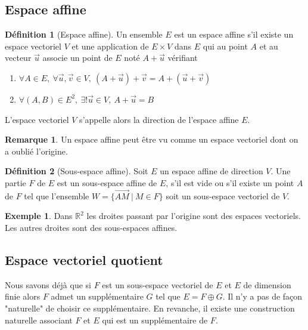 \documentclass[a4paper,12pt,titlepage]{article}
\theoremstyle{plain}
\theoremstyle{definition}
\newtheorem{defi}{Définition}
\newtheorem{rmq}{Remarque}
\newtheorem{ex}{Exemple}
\begin{document}
\subsection{Espace affine}
\begin{defi}[Espace affine]
  Un ensemble $E$ est un espace affine s'il existe un espace vectoriel $V$ et une application de $E \times V$ dans $E$ qui au point $A$ et au vecteur $\overrightarrow{u}$ associe un point de $E$ noté $A+\overrightarrow{u}$ vérifiant

  \begin{enumerate}
  \item $ \forall A \in E,~\forall \overrightarrow{u},\overrightarrow{v} \in V,~(A+\overrightarrow{u})+\overrightarrow{v}=A+(\overrightarrow{u}+\overrightarrow{v})$
  \item $ \forall (A,B) \in E^2,~\exists!\overrightarrow{u} \in V,~ A+\overrightarrow{u}=B$
  \end{enumerate}
  L'espace vectoriel $V$ s'appelle alors la direction de l'espace affine $E$.
\end{defi}

\begin{rmq}
  Un espace affine peut être vu comme un espace vectoriel dont on a oublié l'origine.
\end{rmq}

\begin{defi}[Sous-espace affine]
Soit $E$ un espace affine de direction $V$.
Une partie $F$ de $E$ est un sous-espace affine de $E$, s'il est vide ou s'il existe un point $A$ de $F$ tel que l'ensemble $W = \{ \overrightarrow{AM}~|~M \in F \}$ soit un sous-espace vectoriel de $V$.
\end{defi}

\begin{ex}
  Dans $\mathbb{R}^2$ les droites passant par l'origine sont des espaces vectoriels. Les autres droites sont des sous-espaces affines. 
\end{ex}



\subsection{Espace vectoriel quotient}

Nous savons déjà que si $F$ est un sous-espace vectoriel de $E$ et $E$ de dimension finie alors $F$ admet un supplémentaire $G$ tel que $E = F \oplus G$. Il n'y a pas de façon "naturelle" de choisir ce supplémentaire. En revanche, il existe une construction naturelle associant $F$ et $E$ qui est un supplémentaire de $F$.
\end{document}
